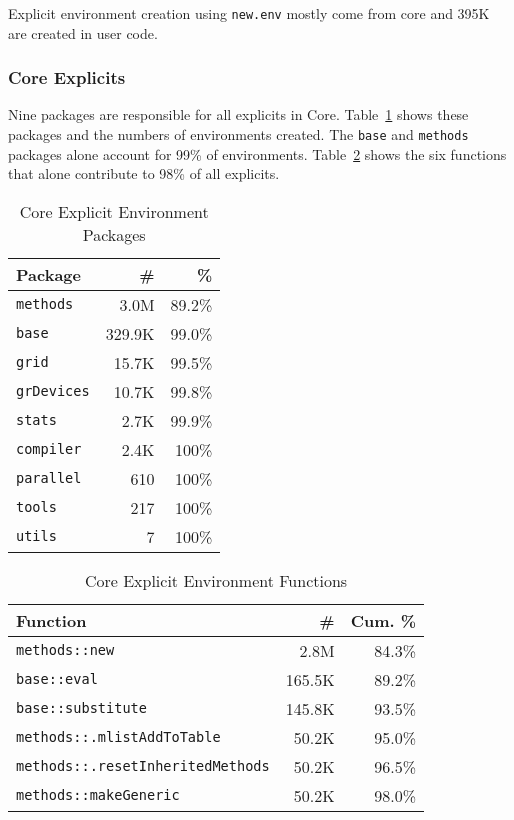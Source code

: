 \documentclass[10pt,review,sigplan,authorversion=true]{acmart}
\renewcommand{\c}[1]{\lstinline |#1|\xspace}
\newcommand{\newEnv}{\c{new.env}}
\begin{document}
Explicit environment creation using \newEnv mostly come from core and 395K are
created in user code.

\subsubsection{Core Explicits}

Nine packages are responsible for all explicits in Core.
Table~\ref{table:core_explicit_pack} shows these packages and the numbers of
environments created. The \c{base} and \c{methods} packages alone account for
99\% of environments. Table~\ref{table:core_explicit_fun} shows the six
functions that alone contribute to 98\% of all explicits.

\begin{table}[!h]
  \small
  \caption{Core Explicit Environment Packages} \label{table:core_explicit_pack}
  \centering
  \begin{tabular}{lrr}
    \toprule
    \textbf{Package}&\textbf{\#}&\textbf{\%}\\
    \midrule
    \c{methods}&3.0M&89.2\%\\
    \c{base}&329.9K&99.0\%\\
    \c{grid}&15.7K&99.5\%\\
    \c{grDevices}&10.7K&99.8\%\\
    \c{stats}&2.7K&99.9\%\\
    \c{compiler}&2.4K&100\%\\
    \c{parallel}&610&100\%\\
    \c{tools}&217&100\%\\
    \c{utils}&7&100\%\\
    \bottomrule
  \end{tabular}
\end{table}


\begin{table}[!h]
  \small
  \caption{Core Explicit Environment Functions} \label{table:core_explicit_fun}
  \centering
  \begin{tabular}{lrr}
    \toprule
    \textbf{Function}&\textbf{\#}&\textbf{Cum. \%}\\
    \midrule
    \c{methods::new}&2.8M&84.3\%\\
    \c{base::eval}&165.5K&89.2\%\\
    \c{base::substitute}&145.8K&93.5\%\\
    \c{methods::.mlistAddToTable}&50.2K&95.0\%\\
    \c{methods::.resetInheritedMethods}&50.2K&96.5\%\\
    \c{methods::makeGeneric}&50.2K&98.0\%\\
    \bottomrule
  \end{tabular}
\end{table}
\end{document}

